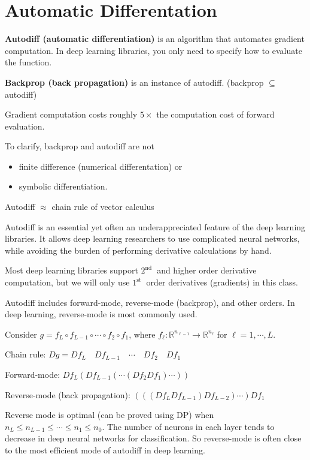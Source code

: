 \section{Automatic Differentation}

\begin{definition}
    \textbf{Autodiff (automatic differentiation)} is an algorithm that automates gradient computation. In deep learning libraries, you only need to specify how to evaluate the function.

    \textbf{Backprop (back propagation)} is an instance of autodiff. (backprop $\subseteq$ autodiff)

    Gradient computation costs roughly $5 \times$ the computation cost of forward evaluation.

    To clarify, backprop and autodiff are not

    \begin{itemize}
        \item finite difference (numerical differentation) or
        \item symbolic differentiation.
    \end{itemize}

    Autodiff $\approx$ chain rule of vector calculus

    \par\noindent\textcolor{gray}{\hdashrule{\textwidth}{0.4pt}{1pt 2pt}}

    Autodiff is an essential yet often an underappreciated feature of the deep learning libraries. It allows deep learning researchers to use complicated neural networks, while avoiding the burden of performing derivative calculations by hand.

    Most deep learning libraries support $2^{\text {nd }}$ and higher order derivative computation, but we will only use $1^{\text {st }}$ order derivatives (gradients) in this class.

    Autodiff includes forward-mode, reverse-mode (backprop), and other orders. In deep learning, reverse-mode is most commonly used.
\end{definition}

\begin{concept}
    Consider $g=f_{L} \circ f_{L-1} \circ \cdots \circ f_{2} \circ f_{1}$, where $f_{\ell}: \mathbb{R}^{n_{\ell-1}} \rightarrow \mathbb{R}^{n_{\ell}}$ for $\ell=1, \cdots, L$.

    Chain rule: $D g=D f_{L} \quad D f_{L-1} \quad \cdots \quad D f_{2} \quad D f_{1}$

    Forward-mode: $D f_{L}\left(D f_{L-1}\left(\cdots\left(D f_{2} D f_{1}\right) \cdots\right)\right)$

    Reverse-mode (back propagation): $\left(\left(\left(D f_{L} D f_{L-1}\right) D f_{L-2}\right) \cdots\right) D f_{1}$

    Reverse mode is optimal (can be proved using DP) when $n_{L} \leq n_{L-1} \leq \cdots \leq n_{1} \leq n_{0}$. The number of neurons in each layer tends to decrease in deep neural networks for classification. So reverse-mode is often close to the most efficient mode of autodiff in deep learning.
\end{concept}

